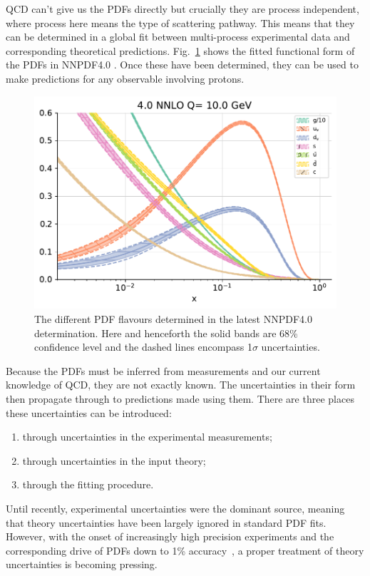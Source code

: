 \documentclass[a4paper,12pt,oneside,openright]{book}
\numberwithin{equation}{section}
\numberwithin{figure}{section}
\numberwithin{table}{section}
\begin{document}
QCD can't give us the PDFs directly but crucially they are process independent, where process here means the type of scattering pathway. This means that
they can be determined in a global fit between multi-process experimental data and corresponding
theoretical predictions.
Fig.~\ref{fig:pdfs} shows the fitted functional form of the PDFs in NNPDF4.0 \cite{Ball:2017nwa}. Once these have been determined, they can be used to make predictions for any observable involving protons.
\begin{figure}[h]
\centering
\includegraphics[width=\textwidth]{pdfflavourplot.pdf}
\caption{The different PDF flavours determined in the latest NNPDF4.0 determination. Here and henceforth the solid bands are 68\% confidence level and the dashed lines encompass 1$\sigma$ uncertainties.\label{fig:pdfs}}
\end{figure}

Because the PDFs must be inferred from measurements and our current knowledge of QCD, they are not exactly known. The uncertainties in their form then propagate through to predictions made using them. There are three
places these uncertainties can be introduced:
\begin{enumerate}
\item through uncertainties in the experimental measurements;
\item through uncertainties in the input theory;
\item through the fitting procedure.
\end{enumerate}
Until recently, experimental uncertainties were the dominant source, meaning that theory uncertainties have been largely ignored in standard PDF fits. However, with the onset of increasingly high precision experiments and the corresponding drive of PDFs down to 1\% accuracy~\cite{Cepeda:2019klc,Azzi:2019yne}, a proper treatment of theory uncertainties is becoming pressing. 
\end{document}
